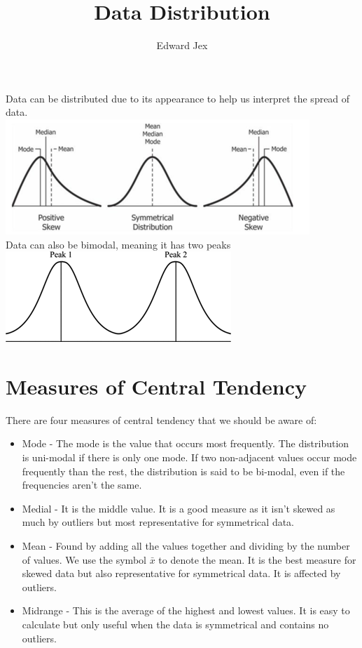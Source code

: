 \documentclass[a4paper,12pt]{article}
\begin{document}
\title{Data Distribution}	
\author{Edward Jex}
\maketitle

Data can be distributed due to its appearance to help us interpret the spread of data. \\
\includegraphics[scale=1.5]{SkewedData} \\
Data can also be bimodal, meaning it has two peaks \\
\includegraphics[scale=0.7]{Bimodal} \\

\section*{Measures of Central Tendency}
There are four measures of central tendency that we should be aware of:
\begin{itemize}
	\item Mode - The mode is the value that occurs most frequently. The distribution is uni-modal if there is only one mode. If two non-adjacent values occur mode frequently than the rest, the distribution is said to be bi-modal, even if the frequencies aren't the same. 
	\item Medial - It is the middle value. It is a good measure as it isn't skewed as much by outliers but most representative for symmetrical data. 
	\item Mean - Found by adding all the values together and dividing by the number of values. We use the symbol $\bar{x}$ to denote the mean. It is the best measure for skewed data but also representative for symmetrical data. It is affected by outliers. 
	\item Midrange - This is the average of the highest and lowest values. It is easy to calculate but only useful when the data is symmetrical and contains no outliers. 
\end{itemize}
\end{document}
